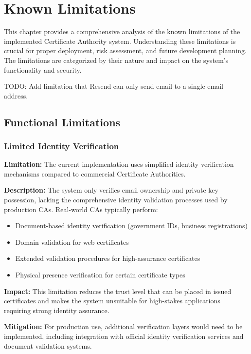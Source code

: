 \chapter{Known Limitations}

This chapter provides a comprehensive analysis of the known limitations of the implemented Certificate Authority system. Understanding these limitations is crucial for proper deployment, risk assessment, and future development planning. The limitations are categorized by their nature and impact on the system's functionality and security.

{\color{red}TODO: Add limitation that Resend can only send email to a single email address.}

\section{Functional Limitations}

\subsection{Limited Identity Verification}

\textbf{Limitation:} The current implementation uses simplified identity verification mechanisms compared to commercial Certificate Authorities.

\textbf{Description:} The system only verifies email ownership and private key possession, lacking the comprehensive identity validation processes used by production CAs. Real-world CAs typically perform:
\begin{itemize}
    \item Document-based identity verification (government IDs, business registrations)
    \item Domain validation for web certificates
    \item Extended validation procedures for high-assurance certificates
    \item Physical presence verification for certain certificate types
\end{itemize}

\textbf{Impact:} This limitation reduces the trust level that can be placed in issued certificates and makes the system unsuitable for high-stakes applications requiring strong identity assurance.

\textbf{Mitigation:} For production use, additional verification layers would need to be implemented, including integration with official identity verification services and document validation systems.

